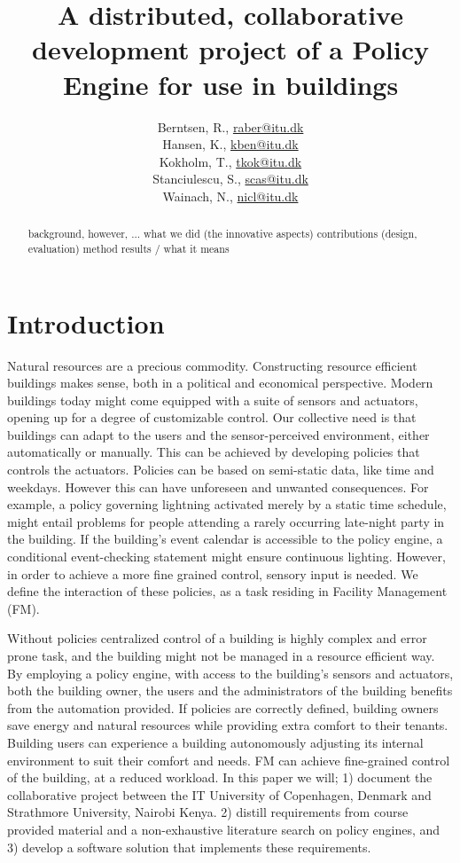 \documentclass[11pt]{report}
\title{A distributed, collaborative development project of a Policy Engine for use in buildings\\\scalebox{0.85}{Global Software Development}}
\author{Berntsen, R., \url{raber@itu.dk}\\Hansen, K., \url{kben@itu.dk}\\Kokholm, T., \url{tkok@itu.dk}\\Stanciulescu, S., \url{scas@itu.dk}\\Wainach, N., \url{nicl@itu.dk}}
\begin{document}
\maketitle
\begin{abstract}

background, however, ...
what we	did (the innovative aspects)
contributions (design, evaluation) method
results / what it means

\end{abstract}
\tableofcontents


\chapter{Introduction}
Natural resources are a precious commodity. Constructing resource efficient buildings makes sense, both in a political and economical perspective. Modern buildings today might come equipped with a suite of sensors and actuators, opening up for a degree of customizable control. Our collective need is that buildings can adapt to the users and the sensor-perceived environment, either automatically or manually. This can be achieved by developing policies that controls the actuators. Policies can be based on semi-static data, like time and weekdays. However this can have unforeseen and unwanted consequences. For example, a policy governing lightning activated merely by a static time schedule, might entail problems for people attending a rarely occurring late-night party in the building. If the building’s event calendar is accessible to the policy engine, a conditional event-checking statement might ensure continuous lighting. However, in order to achieve a more fine grained control, sensory input is needed. We define the interaction of these policies, as a task residing in Facility Management (FM). 

Without policies centralized control of a building is highly complex and error prone task, and the building might not be managed in a resource efficient way. By employing a policy engine, with access to the building’s sensors and actuators, both the building owner, the users and the administrators of the building benefits from the automation provided. If policies are correctly defined, building owners save energy and natural resources while providing extra comfort to their tenants. Building users can experience a building autonomously adjusting its internal environment to suit their comfort and needs. FM can achieve fine-grained control of the building, at a reduced workload. 
\newpage
In this paper we will; 1) document the collaborative project between the IT University of Copenhagen, Denmark and Strathmore University, Nairobi Kenya. 2) distill requirements from course provided material and a non-exhaustive literature search on policy engines, and 3) develop a software solution that implements these requirements.
\end{document}

